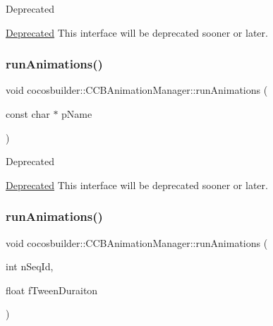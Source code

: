 \begin{DoxyRefDesc}{Deprecated}
\item[\hyperlink{deprecated__deprecated000071}{Deprecated}]This interface will be deprecated sooner or later. \end{DoxyRefDesc}
\mbox{\label{classcocosbuilder_1_1CCBAnimationManager_afef9e870e31dc6e77da6862995fb8d1f}} 
\subsubsection{\texorpdfstring{run\+Animations()}{runAnimations()}\hspace{0.1cm}{\footnotesize\ttfamily [2/6]}}
{\footnotesize\ttfamily void cocosbuilder\+::\+C\+C\+B\+Animation\+Manager\+::run\+Animations (\begin{DoxyParamCaption}\item[{const char $\ast$}]{p\+Name }\end{DoxyParamCaption})}

\begin{DoxyRefDesc}{Deprecated}
\item[\hyperlink{deprecated__deprecated000072}{Deprecated}]This interface will be deprecated sooner or later. \end{DoxyRefDesc}
\mbox{\label{classcocosbuilder_1_1CCBAnimationManager_aa36b27e55afbd31f6f5b6a05bd662079}} 
\subsubsection{\texorpdfstring{run\+Animations()}{runAnimations()}\hspace{0.1cm}{\footnotesize\ttfamily [3/6]}}
{\footnotesize\ttfamily void cocosbuilder\+::\+C\+C\+B\+Animation\+Manager\+::run\+Animations (\begin{DoxyParamCaption}\item[{int}]{n\+Seq\+Id,  }\item[{float}]{f\+Tween\+Duraiton }\end{DoxyParamCaption})}

